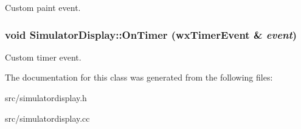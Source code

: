 Custom paint event. 

\subsubsection{\setlength{\rightskip}{0pt plus 5cm}void Simulator\-Display::On\-Timer (wx\-Timer\-Event \& {\em event})}\label{classSimulatorDisplay_SimulatorDisplaya3}


Custom timer event. 



The documentation for this class was generated from the following files:\begin{CompactItemize}
\item 
src/simulatordisplay.h\item 
src/simulatordisplay.cc\end{CompactItemize}

